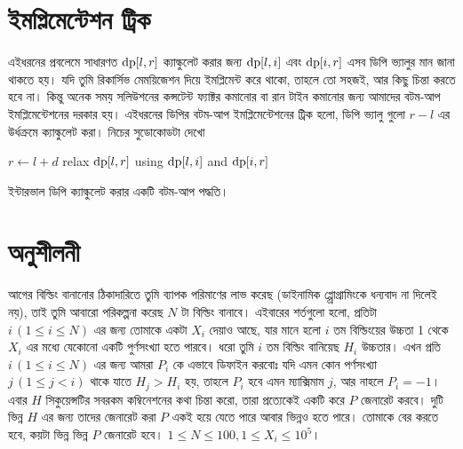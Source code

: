\section{ইমপ্লিমেন্টেশন ট্রিক}

এইধরনের প্রবলেমে সাধারণত $\text{dp}[l, r]$ ক্যাল্কুলেট করার জন্য
$\text{dp}[l, i]$ এবং $\text{dp}[i, r]$ এসব ডিপি ভ্যালুর মান জানা থাকতে হয়। যদি
তুমি রিকার্সিভ মেময়িজেশন দিয়ে ইমপ্লিমেন্ট করে থাকো, তাহলে তো সহজই, আর কিছু
চিন্তা করতে হবে না। কিন্তু অনেক সময় সলিউশনের কন্সটেন্ট ফ্যাক্টর কমানোর বা
রান টাইন কমানোর জন্য আমাদের বটম-আপ ইমপ্লিমেন্টেশনের দরকার হয়। এইধরনের ডিপির
বটম-আপ ইমপ্লিমেন্টেশনের ট্রিক হলো, ডিপি ভ্যালু গুলো $r - l$ এর উর্ধক্রমে
ক্যাল্কুলেট করা। নিচের সুডোকোডটা দেখো

\begin{algorithm}[H]
   {
     {
      $r \gets l + d$\;
       {
        relax $\text{dp}[l, r]$ using $\text{dp}[l, i]$ and $\text{dp}[i, r]$\;
      }
    }
  }
  \caption{ইন্টারভাল ডিপি ক্যাল্কুলেট করার একটি বটম-আপ পদ্ধতি।}
\end{algorithm}

\section{অনুশীলনী}

\begin{exercise}
  আগের বিল্ডিং বানানোর ঠিকাদারিতে তুমি ব্যাপক পরিমাণের লাভ করেছ (ডাইনামিক
  প্প্রোগ্রামিংকে ধন্যবাদ না দিলেই নয়), তাই তুমি আবারো পরিকল্পনা করেছ $N$ টা
  বিল্ডিং বানাবে। এইবারের শর্তগুলো হলো, প্রতিটা $i \, (1 \le i \le N)$ এর
  জন্য তোমাকে একটা $X_i$ দেয়াও আছে, যার মানে হলো $i$ তম বিল্ডিংয়ের উচ্চতা 1
  থেকে $X_i$ এর মধ্যে যেকোনো একটি পুর্ণসংখ্যা হতে পারবে। ধরো তুমি $i$ তম
  বিল্ডিং বানিয়েছ $H_i$ উচ্চতার। এখন প্রতি $i \, (1 \le i \le N)$ এর জন্য
  আমরা $P_i$ কে এভাবে ডিফাইন করবোঃ যদি এমন কোন পর্ণসংখ্যা $j \, (1 \le j <
  i)$ থাকে যাতে $H_j > H_i$ হয়, তাহলে $P_i$ হবে এমন ম্যাক্সিমাম $j$, আর নাহলে
  $P_i = -1$। এবার $H$ সিকুয়েন্সটির সবরকম কম্বিনেশনের কথা চিন্তা করো, তারা
  প্রত্যেকেই একটি করে $P$ জেনারেট করবে। দুটি ভিন্ন $H$ এর জন্য তাদের জেনারেট
  করা $P$ একই হয়ে যেতে পারে আবার ভিন্নও হতে পারে। তোমাকে বের করতে হবে, কয়টা
  ভিন্ন ভিন্ন $P$ জেনারেট হবে। $1 \le N \le 100, 1 \le X_i \le 10^5$।
\end{exercise}
